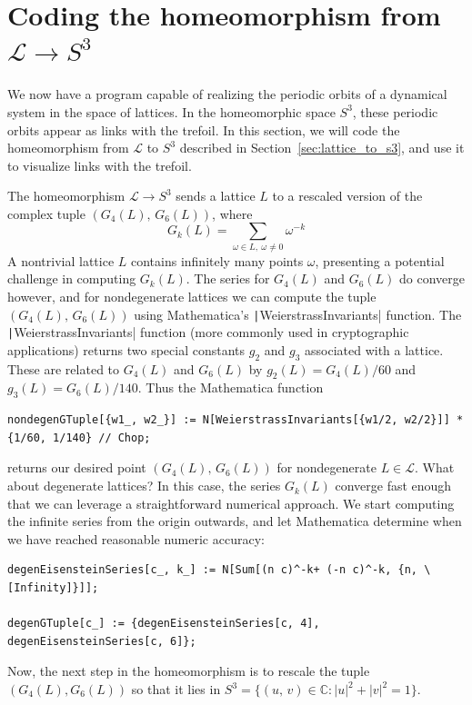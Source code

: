 \documentclass[12pt,twoside]{reedthesis}
\theoremstyle{definition}
\newcommand{\C}{\mathbb{C}}
\newcommand{\LS}{\mathcal{L}}
\begin{document}
\section{Coding the homeomorphism from $\LS \to S^3$}

We now have a program capable of realizing the periodic orbits of a dynamical system in the space of lattices.
In the homeomorphic space $S^3$, these periodic orbits appear as links with the trefoil.
In this section, we will code the homeomorphism from $\LS$ to $S^3$ described in Section~\ref{sec:lattice_to_s3}, and use it to visualize links with the trefoil.

The homeomorphism $\LS \to S^3$ sends a lattice $L$ to a rescaled version of the complex tuple $(G_4(L),\, G_6(L))$, where
\begin{equation*}
  G_k(L) = \sum_{\omega \in L,\ \omega \neq 0} \omega^{-k}
\end{equation*}
A nontrivial lattice $L$ contains infinitely many points $\omega$, presenting a potential challenge in computing $G_k(L)$.
The series for $G_4(L)$ and $G_6(L)$ do converge however, and for nondegenerate lattices we can compute the tuple $(G_4(L),\, G_6(L))$ using Mathematica's \texttt|WeierstrassInvariants| function.
The \texttt|WeierstrassInvariants| function (more commonly used in cryptographic applications) returns two special constants $g_2$ and $g_3$ associated with a lattice.
These are related to $G_4(L)$ and $G_6(L)$ by $g_2(L) = G_4(L) / 60$ and $g_3(L) = G_6(L) / 140$.
Thus the Mathematica function
\begin{verbatim}
nondegenGTuple[{w1_, w2_}] := N[WeierstrassInvariants[{w1/2, w2/2}]] * {1/60, 1/140} // Chop;
\end{verbatim}
returns our desired point $(G_4(L),\, G_6(L))$ for nondegenerate $L \in \LS$.
What about degenerate lattices?
In this case, the series $G_k(L)$ converge fast enough that we can leverage a straightforward numerical approach.
We start computing the infinite series from the origin outwards, and let Mathematica determine when we have reached reasonable numeric accuracy:
\begin{verbatim}
degenEisensteinSeries[c_, k_] := N[Sum[(n c)^-k+ (-n c)^-k, {n, \[Infinity]}]];

degenGTuple[c_] := {degenEisensteinSeries[c, 4], degenEisensteinSeries[c, 6]};
\end{verbatim}
Now, the next step in the homeomorphism is to rescale the tuple $(G_4(L), G_6(L))$ so that it lies in $S^3 = \{(u,\, v) \in \C : |u|^2 + |v|^2 = 1\}$.
\end{document}
